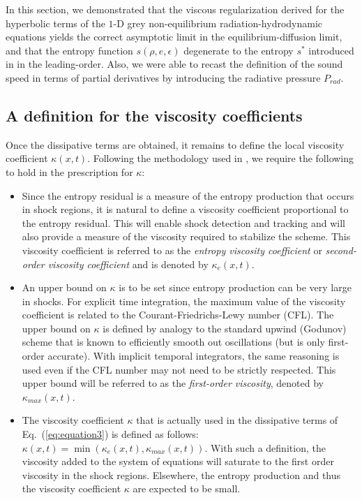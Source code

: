 \documentclass[review]{elsarticle}
\newcommand{\eqt}[1]{Eq.~(\ref{#1})}                     %
\begin{document}
In this section, we demonstrated that the viscous regularization derived for the hyperbolic terms of the $1$-D grey non-equilibrium radiation-hydrodynamic equations yields the correct asymptotic limit in the equilibrium-diffusion limit, and that the entropy function $s(\rho, e, \epsilon)$ degenerate to the entropy $s^*$ introduced in \cite{LowrieMorel} in the leading-order. Also, we were able to recast the definition of the sound speed in terms of partial derivatives by introducing the radiative pressure $P_{rad}$.

\subsection{A definition for the viscosity coefficients}
Once the dissipative terms are obtained, it remains to define the local viscosity coefficient $\kappa(x,t)$. Following the methodology used in \cite{jlg1, jlg2}, we require the following to hold in the prescription for $\kappa$:
\begin{itemize}
\item Since the entropy residual is a measure of the entropy production that occurs in shock regions, it is natural to define a viscosity coefficient proportional to the entropy residual. This will enable shock detection and tracking and will also provide a measure of the viscosity required to stabilize the scheme. This viscosity coefficient is referred to as the \emph{entropy viscosity coefficient} or \emph{second-order viscosity coefficient} and is denoted by $\kappa_e(x,t)$.
\item An upper bound on $\kappa$ is to be set since entropy production can be very large in shocks. For explicit time integration, the maximum value of the viscosity coefficient is related to the Courant-Friedrichs-Lewy number (CFL). The upper bound on  $\kappa$  is defined by analogy to the standard upwind (Godunov) scheme that is known to efficiently smooth out oscillations (but is only first-order accurate). With implicit temporal integrators, the same reasoning is used even if the CFL number may not need to be strictly respected. This upper bound will be referred to as the \emph{first-order viscosity}, denoted by $\kappa_{max}(x,t)$.  
\item The viscosity coefficient $\kappa$ that is actually used in the dissipative terms of \eqt{eq:equation3} is defined as follows: $\kappa(x,t) = \min ( \kappa_e(x,t), \kappa_{max}(x,t) )$. With such a definition, the viscosity added to the system of equations will saturate to the first order viscosity in the shock regions. Elsewhere, the entropy production and thus the viscosity coefficient $\kappa$ are expected to be small.
\end{itemize}
\end{document}
